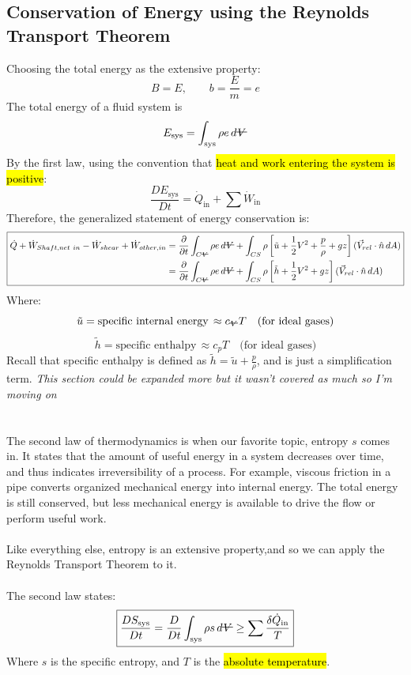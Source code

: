 ﻿\documentclass[12pt]{article}
\newcommand{\vol}{\mathord{\text{\ooalign{\hidewidth $V$\hidewidth\cr\kern-0.5pt\raisebox{0.8ex}{\rule[0pt]{1em}{0.5pt}}}}}}
\begin{document}
\subsection*{Conservation of Energy using the Reynolds Transport Theorem}
Choosing the total energy as the extensive property:
\[
B=E,\qquad b=\frac{E}{m}=e
\]
The total energy of a fluid system is
\[
E_{\mathrm{sys}}=\int_{\mathrm{sys}}\rho e\,d\vol
\]
By the first law, using the convention that \hl{heat and work entering the system is positive}:
\[\boxed{\frac{DE_\text{sys}}{Dt} = \dot{Q}_\text{in} + \sum \dot{W}_{\text{in}}}\]
Therefore, the generalized statement of energy conservation is:
\[
\boxed{\begin{aligned}
\dot{Q}+\dot{W}_{Shaft,net\ in}-\dot{W}_{shear}+\dot{W}_{other,in}
&=\frac{\partial}{\partial t}\int_{C\vol}\rho e\,d\vol
+\int_{CS}\rho\left[\tilde{u}+\frac{1}{2}V^2+\frac{p}{\rho}+gz\right]
(\vec{V}_{rel}\cdot\hat{n}\,dA)\\
&=\frac{\partial}{\partial t}\int_{C\vol}\rho e\,d\vol
+\int_{CS}\rho\left[\tilde{h}+\frac{1}{2}V^2+gz\right]
(\vec{V}_{rel}\cdot\hat{n}\,dA)
\end{aligned}}
\]
Where:
\[\tilde{u} = \text{specific internal energy}\, \approx c_{\vol} T  \quad \text{(for ideal gases)}\]
\[\tilde{h} = \text{specific enthalpy}\, \approx c_p T  \quad \text{(for ideal gases)}\]
Recall that specific enthalpy is defined as $\tilde{h} = \tilde{u} + \frac{p}{\rho}$, and is just a simplification term.
\textit{This section could be expanded more but it wasn't covered as much so I'm moving on}
\section*{}
The second law of thermodynamics is when our favorite topic, entropy $s$ comes in. It states that the amount of useful energy in a system decreases over time, and thus indicates irreversibility of a process. For example, viscous friction in a pipe converts organized mechanical energy into internal energy. The total energy is still conserved, but less mechanical energy is available to drive the flow or perform useful work.\\\\
Like everything else, entropy is an extensive property,and so we can apply the Reynolds Transport Theorem to it.\\\\
The second law states:
\[
\boxed{\frac{DS_\text{sys}}{Dt}=\frac{D}{Dt}\int_{\mathrm{sys}}\rho s\,d\vol\geq\sum\frac{\delta\dot Q_{\mathrm{in}}}{T}}
\]
Where $s$ is the specific entropy, and $T$ is the \hl{absolute temperature}.
\end{document}
